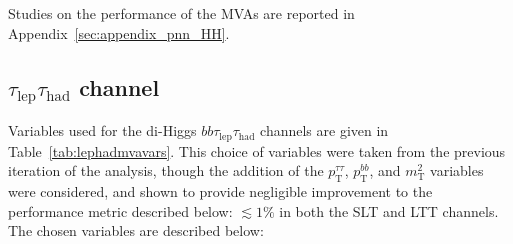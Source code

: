 Studies on the performance of the MVAs are reported in Appendix~\ref{sec:appendix_pnn_HH}.


\subsection{$\tau_\mathrm{lep}\tau_\mathrm{had}$ channel}
\label{ssec:mva_lephad}

Variables used for the di-Higgs $bb\tau_\mathrm{lep}\tau_\mathrm{had}$ channels are given in Table~\ref{tab:lephadmvavars}. This choice of variables were taken from the previous iteration of the analysis, though the addition of the $p_\mathrm{T}^{\tau\tau}$, $p_\mathrm{T}^{bb}$, and $m_\mathrm{T}^2$ variables were considered, and shown to provide negligible improvement to the performance metric described below: $\lesssim 1\%$ in both the SLT and LTT channels. The chosen variables are described below:

